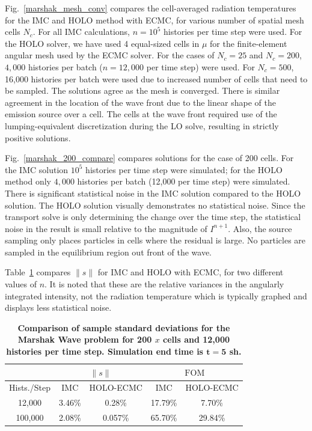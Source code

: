 \documentclass{mc2013}
\renewcommand{\ss}{\ensuremath{\|s\|}}
\newcommand{\FOM}{\ensuremath{\text{FOM}}}
\begin{document}
Fig.~\ref{marshak_mesh_conv} compares the cell-averaged radiation temperatures  for the
IMC and HOLO method with ECMC, for various number of spatial mesh cells $N_c$.  For
all IMC calculations, $n=10^5$ histories per time step were used.  For the HOLO solver, we have used
4 equal-sized cells in $\mu$ for the finite-element angular mesh used by the ECMC solver. For the cases
of $N_c=25$ and $N_c=200$, $4,000$ histories per batch ($n=12,000$ per time step)  were used.  For $N_c=500$, 16,000 histories per batch were used due to increased number of cells that
need to be sampled.  The solutions agree as the mesh is converged.  There is
similar agreement in the location of the wave front due to the linear shape of the emission source over a cell.  The cells
at the wave front required use of the lumping-equivalent discretization during the LO
solve, resulting in strictly positive solutions.

Fig.~\ref{marshak_200_compare} compares solutions
for the case of 200 cells.  For the IMC solution $10^5$ histories per time step were
simulated; for the HOLO method only $4,000$ histories per batch
(12,000 per time step) were simulated. There is significant statistical noise in the IMC solution
compared to the HOLO solution.  The HOLO solution visually demonstrates no statistical noise.  Since the transport solve is only determining the change over the
time step, the statistical noise in the result is small relative to the magnitude of
$I^{n+1}$.  Also, the source sampling only places particles in cells where the residual is
large.  No particles are sampled in the equilibrium region out front of the wave. 


Table~\ref{marshak_var} compares $\ss$ for IMC and HOLO with ECMC, for two different
values of $n$.   It is noted that these are the relative variances in the angularly integrated intensity,
not the radiation temperature which is typically graphed and displays less statistical noise.


\begin{table}[H]
\centering
\caption{\label{marshak_var} \textbf{Comparison of sample standard deviations for the Marshak Wave problem
    for 200 $x$ cells and 12,000 histories per time step.   Simulation end time is $\mathbf{t=5}$ sh.}}
\vspace{-0.1in}
\begin{tabular}{|c|cc|cc|}\cline{2-5}
    \multicolumn{1}{c|}{}       & \multicolumn{2}{|c|}{\ss} &
    \multicolumn{2}{|c|}{\FOM} \\ \hline
Hists./Step   & IMC & HOLO-ECMC &  IMC & HOLO-ECMC   \\ \hline
   12,000	 & 3.46\%  & 0.28\% &  17.79\%    &  7.70\%            \\
  100,000    & 2.08\%  & 0.057\% & 65.70\%    & 29.84\%     \\ \hline
\end{tabular}
\end{table}
\end{document}
